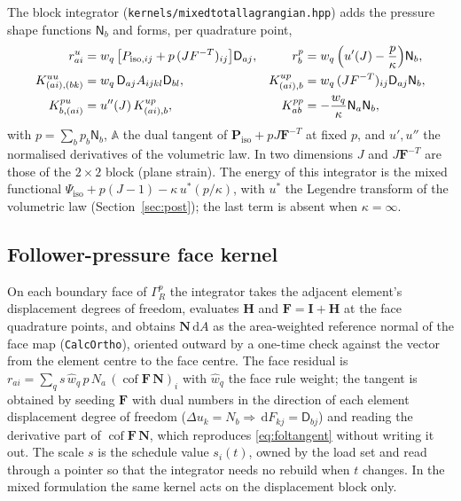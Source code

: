 \documentclass[11pt]{article}
\newcommand{\ud}{\,\mathrm{d}}
\newcommand{\cof}{\operatorname{cof}}
\newcommand{\bN}{\bm{N}}
\newcommand{\bP}{\bm{P}}
\newcommand{\bF}{\bm{F}}
\newcommand{\bI}{\bm{I}}
\newcommand{\bH}{\bm{H}}
\newcommand{\bA}{\mathbb{A}}
\DeclareRobustCommand{\code}[1]{{\def\_{\textunderscore\allowbreak}\texttt{#1}}}
\DeclareRobustCommand{\file}[1]{{\def\_{\textunderscore\allowbreak}\texttt{#1}}}
\begin{document}
The block integrator (\file{kernels/mixed\_total\_lagrangian.hpp}) adds the
pressure shape functions $\mathsf{N}_b$ and forms, per quadrature point,
\begin{equation}
  \begin{aligned}
  r^u_{ai} &= w_q\,\bigl[P_{\mathrm{iso},ij} + p\,(J F^{-T})_{ij}\bigr]\mathsf{D}_{aj}, &
  r^p_b &= w_q\,\Bigl(u'(J) - \frac{p}{\kappa}\Bigr)\mathsf{N}_b, \\
  K^{uu}_{(ai),(bk)} &= w_q\,\mathsf{D}_{aj}A_{ijkl}\mathsf{D}_{bl}, &
  K^{up}_{(ai),b} &= w_q\,(JF^{-T})_{ij}\mathsf{D}_{aj}\mathsf{N}_b, \\
  K^{pu}_{b,(ai)} &= u''(J)\,K^{up}_{(ai),b}, &
  K^{pp}_{ab} &= -\frac{w_q}{\kappa}\mathsf{N}_a\mathsf{N}_b,
  \end{aligned}
\end{equation}
with $p = \sum_b p_b\mathsf{N}_b$, $\bA$ the dual tangent of
$\bP_{\mathrm{iso}} + pJ\bF^{-T}$ at fixed $p$, and $u', u''$ the
normalised derivatives of the volumetric law.  In two dimensions $J$ and
$J\bF^{-T}$ are those of the $2\times2$ block (plane strain).  The energy
of this integrator is the mixed functional
$\Psi_{\mathrm{iso}} + p(J-1) - \kappa\,u^*(p/\kappa)$, with $u^*$ the
Legendre transform of the volumetric law
(Section~\ref{sec:post}); the last term is absent when $\kappa = \infty$.

\subsection{Follower-pressure face kernel}
\label{sec:folkernel}

On each boundary face of $\Gamma_R^p$ the integrator takes the adjacent
element's displacement degrees of freedom, evaluates $\bH$ and
$\bF = \bI + \bH$ at the face quadrature points, and obtains $\bN\ud A$ as
the area-weighted reference normal of the face map (\code{CalcOrtho}),
oriented outward by a one-time check against the vector from the element
centre to the face centre.  The face residual is
$r_{ai} = \sum_q s\,\hat w_q\,p\,N_a\,(\cof\bF\,\bN)_i$ with $\hat w_q$ the
face rule weight; the tangent is obtained by seeding $\bF$ with dual numbers
in the direction of each element displacement degree of freedom
($\Delta u_k = N_b \Rightarrow \ud F_{kj} = \mathsf{D}_{bj}$) and reading
the derivative part of $\cof\bF\,\bN$, which reproduces
\eqref{eq:foltangent} without writing it out.  The scale $s$ is the
schedule value $s_i(t)$, owned by the load set and read through a pointer
so that the integrator needs no rebuild when $t$ changes.  In the mixed
formulation the same kernel acts on the displacement block only.
\end{document}
